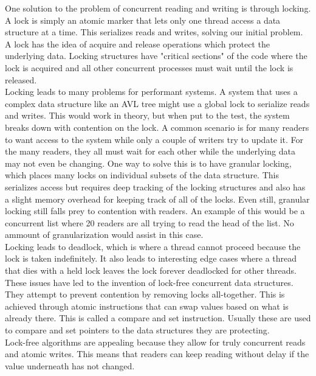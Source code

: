 \documentclass[11pt]{article}
\renewcommand{\_}{\rule{.4em}{.06em}\hspace{.05em}}
\renewcommand{\.}[1]{\ensuremath{\mbox{}#1\mbox{}}}
\begin{document}
One solution to the problem of concurrent reading and writing is through locking. A lock is simply an atomic marker that lets only one thread access a data structure at a time. This serializes reads and writes, solving our initial problem. A lock has the idea of acquire and release operations which protect the underlying data. Locking structures have "critical sections" of the code where the lock is acquired and all other concurrent processes must wait until the lock is released. \\

Locking leads to many problems for performant systems. A system that uses a complex data structure like an AVL tree might use a global lock to serialize reads and writes. This would work in theory, but when put to the test, the system breaks down with contention on the lock. A common scenario is for many readers to want access to the system while only a couple of writers try to update it. For the many readers, they all must wait for each other while the underlying data may not even be changing. One way to solve this is to have granular locking, which places many locks on individual subsets of the data structure. This serializes access but requires deep tracking of the locking structures and also has a slight memory overhead for keeping track of all of the locks. Even still, granular locking still falls prey to contention with readers. An example of this would be a concurrent list where 20 readers are all trying to read the head of the list. No ammount of granularization would assist in this case. \\

Locking leads to deadlock, which is where a thread cannot proceed because the lock is taken indefinitely. It also leads to interesting edge cases where a thread that dies with a held lock leaves the lock forever deadlocked for other threads. \\

These issues have led to the invention of lock-free concurrent data structures. They attempt to prevent contention by removing locks all-together. This is achieved through atomic instructions that can swap values based on what is already there. This is called a compare and set instruction. Usually these are used to compare and set pointers to the data structures they are protecting. \\

Lock-free algorithms are appealing because they allow for truly concurrent reads and atomic writes. This means that readers can keep reading without delay if the value underneath has not changed. \\
\end{document}
